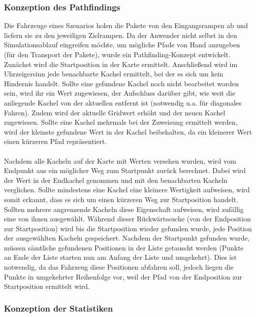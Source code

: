 \subsubsection{Konzeption des Pathfindings}
Die Fahrzeuge eines Szenarios holen die Pakete von den Eingangsrampen ab und liefern sie zu den jeweiligen Zielrampen. Da der Anwender nicht selbst in den Simulationsablauf eingreifen möchte, um mögliche Pfade von Hand anzugeben (für den Transport der Pakete), wurde ein Pathfinding-Konzept entwickelt. Zunächst wird die Startposition in der Karte ermittelt. Anschließend wird im Uhrzeigersinn jede benachbarte Kachel ermittelt, bei der es sich um kein Hindernis handelt. Sollte eine gefundene Kachel noch nicht bearbeitet worden sein, wird ihr ein Wert zugewiesen, der  Aufschluss darüber gibt, wie weit die anliegende Kachel von der aktuellen entfernt ist (notwendig u.a. für diagonales Fahren). Zudem wird der aktuelle Gridwert erhöht und der neuen Kachel zugewiesen. Sollte eine Kachel mehrmals bei der Zuweisung ermittelt werden, wird der kleinste gefundene Wert in der Kachel beibehalten, da ein kleinerer Wert einen kürzeren Pfad repräsentiert.
\\\\
Nachdem alle Kacheln auf der Karte mit Werten versehen wurden, wird vom Endpunkt aus ein möglicher Weg zum Startpunkt zurück berechnet. Dabei wird der Wert in der Endkachel genommen und mit den benachbarten Kacheln verglichen. Sollte mindestens eine Kachel eine kleinere Wertigkeit aufweisen, wird somit erkannt, dass es sich um einen kürzeren Weg zur Startposition handelt. Sollten mehrere angrenzende Kacheln diese Eigenschaft aufweisen, wird zufällig eine von ihnen ausgewählt. Während dieser Rückwärtssuche (von der Endposition zur Startposition)
wird bis die Startposition wieder gefunden wurde, jede Position der ausgewählten Kacheln gespeichert. Nachdem der Startpunkt gefunden wurde, müssen sämtliche gefundenen Positionen in der Liste getauscht werden (Punkte an Ende der Liste starten nun am Anfang der Liste und umgekehrt).
Dies ist notwendig, da das Fahrzeug diese Positionen abfahren soll, jedoch liegen die Punkte in umgekehrter Reihenfolge vor, weil der Pfad von der Endposition zur Startposition ermittelt wird.

\subsubsection{Konzeption der Statistiken}

